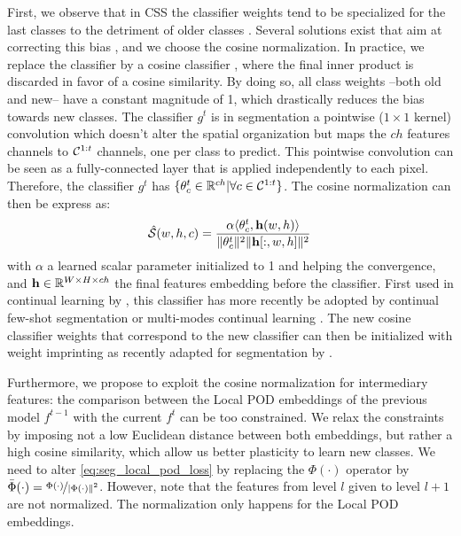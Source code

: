 First, we observe that in \ac{CSS} the classifier weights tend to be specialized for the last classes to
the detriment of older classes \citep{hou2019ucir}. Several solutions exist that aim at correcting
this bias
\citep{wu2019bias_correction,belouadah2019il2m,zhao2020weightalignement,luo2018cosine_classifier}, and
we choose the cosine normalization. In practice, we replace the classifier by a cosine classifier
\citep{luo2018cosine_classifier}, where the final inner product is discarded in favor of a cosine
similarity. By doing so, all class weights --both old and new-- have a constant magnitude of 1,
which drastically reduces the bias towards new classes. The classifier $g^t$ is in segmentation a
pointwise ($1\times1$ kernel) convolution which doesn't alter the spatial organization but maps the
$ch$ features channels to $\mathcal{C}^{1:t}$ channels, one per class to predict. This pointwise
convolution can be seen as a fully-connected layer that is applied independently to each pixel.
Therefore, the classifier $g^t$ has $\{\theta_c^t \in \mathbb{R}^{ch} | \forall c \in \mathcal{C}^{1:t}\}$.
The cosine normalization can then be express as:
%
\begin{equation}
    \hat{\mathcal{S}}(w, h, c) = \frac{\alpha \langle \theta^t_c, \mathbf{h}(w, h) \rangle}{\Vert \theta^t_c \Vert^2 \Vert \mathbf{h}[:,w, h] \Vert^2}\,
    \label{eq:seg_cosine_classifier}
\end{equation}
%
\noindent with $\alpha$ a learned scalar parameter initialized to 1 and helping the convergence, and $\mathbf{h} \in
    \mathbb{R}^{W \times H \times ch}$ the final features embedding before the classifier. First
used in continual learning by \cite{hou2019ucir}, this classifier has more recently be adopted
by continual few-shot segmentation \citep{cermelli2020fewshotcontinualsegm} or multi-modes
continual learning \citep{douillard2020podnet}. The new cosine classifier weights that
correspond to the new classifier can then be initialized with weight imprinting
\citep{qi2018imprintedweights} as recently adapted for segmentation by
\cite{cermelli2020fewshotcontinualsegm}.

Furthermore, we propose to exploit the cosine normalization for intermediary features: the
comparison between the Local POD embeddings of the previous model $f^{t-1}$ with the current $f^t$
can be too constrained. We relax the constraints by imposing not a low Euclidean distance between
both embeddings, but rather a high cosine similarity, which allow us better plasticity to learn new
classes. We need to alter \autoref{eq:seg_local_pod_loss} by replacing the $\Phi(\cdot)$ operator by
$\bar{\Phi}(\cdot) = \nicefrac{\Phi(\cdot)}{\vert\Phi(\cdot)\Vert^2}$. However, note that the
features from level $l$ given to level $l+1$ are not normalized. The normalization only happens for
the Local POD embeddings.

